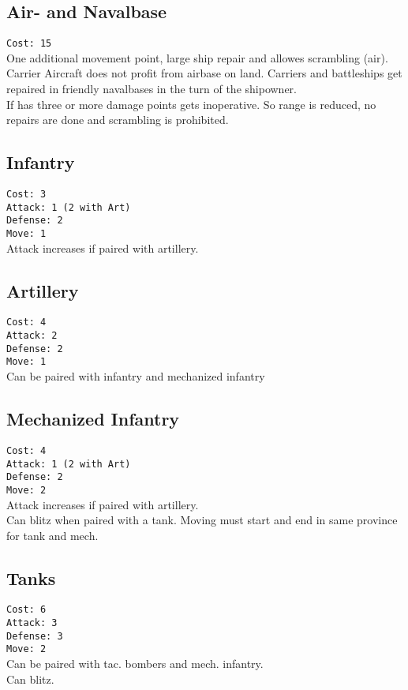 \documentclass[10pt,a4paper,landscape]{article}
\begin{document}
\begin{multicols*}{3}
\subsection*{Air- and Navalbase}
\texttt{Cost: 15}\\
One additional movement point, large ship repair and allowes scrambling (air).\\
Carrier Aircraft does not profit from airbase on land. Carriers and battleships get repaired in friendly navalbases in the turn of the shipowner.
\\
If has three or more damage points gets inoperative. So range is reduced, no repairs are done and scrambling is prohibited.

\subsection*{Infantry}
\texttt{Cost: 3 \\ Attack: 1 (2 with Art) \\ Defense: 2 \\ Move: 1}
\\
Attack increases if paired with artillery.

\subsection*{Artillery}
\texttt{Cost: 4 \\ Attack: 2 \\ Defense: 2 \\ Move: 1}
\\
Can be paired with infantry and mechanized infantry

\subsection*{Mechanized Infantry}
\texttt{Cost: 4 \\ Attack: 1 (2 with Art) \\ Defense: 2 \\ Move: 2}
\\
Attack increases if paired with artillery.\\
Can blitz when paired with a tank. Moving must start and end in same province for tank and mech.

\subsection*{Tanks}
\texttt{Cost: 6 \\ Attack: 3 \\ Defense: 3 \\ Move: 2}
\\
Can be paired with tac. bombers and mech. infantry.\\
Can blitz. 


\end{multicols*}
\end{document}
